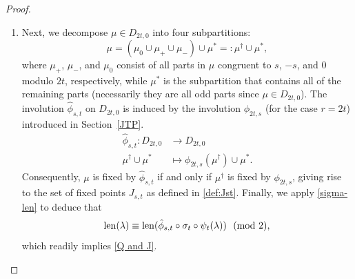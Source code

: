 \documentclass[12pt,reqno]{amsart}
\numberwithin{equation}{section}
\newcommand{\len}{\mathrm{len}}
\newcommand{\tpmod}[1]{\mkern 12mu(\textup{mod}\mkern 6mu #1)}
\begin{document}
\begin{proof}
\begin{enumerate}
		\item[\textbf{Step 3:}]
		Next, we decompose $\mu \in D_{2t,0}$ into four subpartitions:
		\begin{equation}
			\mu = (\mu_0\cup \mu_{+} \cup \mu_{-}) \cup \mu^*=:\mu^{\dagger} \cup \mu^*,
		\end{equation}
		where $\mu_{+}$, $\mu_{-}$, and $\mu_0$ consist of all parts in $\mu$ congruent to $s$, $-s$, and $0$ modulo $2t$, respectively, while $\mu^*$ is the subpartition that contains all of the remaining parts (necessarily they are all odd parts since $\mu\in D_{2t,0}$). The involution $\hat{\phi}_{s,t}$ on $D_{2t,0}$ is induced by the involution $\phi_{2t,s}$ (for the case $r=2t$) introduced in Section~\ref{JTP}.
		\begin{align*}
			\hat{\phi}_{s,t}: D_{2t,0} &\to D_{2t,0} \\
			\mu^{\dagger} \cup \mu^* &\mapsto \phi_{2t,s}(\mu^{\dagger}) \cup \mu^*.
		\end{align*}
		Consequently, $\mu$ is fixed by $\hat{\phi}_{s,t}$ if and only if $\mu^{\dagger}$ is fixed by $\phi_{2t,s}$, giving rise to the set of fixed points $J_{s,t}$ as defined in \eqref{def:Jst}. Finally, we apply \eqref{sigma-len} to deduce that
		$$\len(\lambda) \equiv \len(\hat{\phi}_{s,t}\circ\sigma_t\circ\psi_t(\lambda))\tpmod 2,$$
		which readily implies \eqref{Q and J}.
\end{enumerate}
\end{proof}
\end{document}
